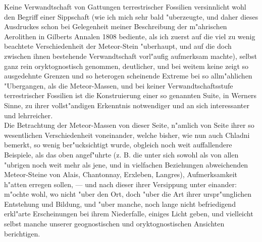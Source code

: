 \documentclass[a4paper, 11pt, oneside, german]{article}
\begin{document}
{{\hspace*{6mm}Keine Verwandtschaft von Gattungen terrestrischer Fossilien versinnlicht wohl den Begriff einer Sippschaft (wie ich mich sehr bald "uberzeugte, und daher dieses Ausdruckes schon bei Gelegenheit meiner Beschreibung der m"ahrischen Aerolithen in Gilberts Annalen 1808 bediente, als ich zuerst auf die viel zu wenig beachtete Verschiedenheit der Meteor-Stein "uberhaupt, und auf die doch zwischen ihnen bestehende Verwandtschaft vorl"aufig aufmerksam machte), selbst ganz rein oryktognostisch genommen, deutlicher, und bei weitem keine zeigt so ausgedehnte Grenzen und so heterogen scheinende Extreme bei so allm"ahlichen "Ubergangen, als die Meteor-Massen, und bei keiner Verwandtschaftsstufe terrestrischer Fossilien ist die Konstruierung einer so genannten Suite, in Werners Sinne, zu ihrer vollst"andigen Erkenntnis notwendiger und an sich interessanter und lehrreicher.\\
\hspace*{6mm}Die Betrachtung der Meteor-Massen von dieser Seite, n"amlich von Seite ihrer so wesentlichen Verschiedenheit voneinander, welche bisher, wie nun auch Chladni bemerkt, so wenig ber"ucksichtigt wurde, obgleich noch weit auffallendere Beispiele, als das oben angef"uhrte (z. B. die unter sich sowohl als von allen "ubrigen noch weit mehr als jene, und in vielfachen Beziehungen abweichenden Meteor-Steine von Alais, Chantonnay, Erxleben, Langres), Aufmerksamkeit h"atten erregen sollen, --- und nach dieser ihrer Versippung unter einander: m"ochte wohl, wo nicht "uber den Ort, doch "uber die Art ihrer urspr"unglichen Entstehung und Bildung, und "uber manche, noch lange nicht befriedigend erkl"arte Erscheinungen bei ihrem Niederfalle, einiges Licht geben, und vielleicht selbst manche unserer geognostischen und oryktognostischen Ansichten berichtigen.}}
\end{document}
